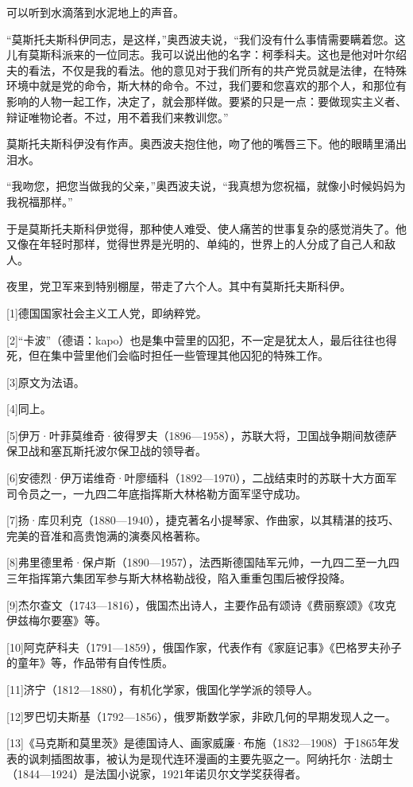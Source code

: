 可以听到水滴落到水泥地上的声音。

“莫斯托夫斯科伊同志，是这样，”奥西波夫说，“我们没有什么事情需要瞒着您。这儿有莫斯科派来的一位同志。我可以说出他的名字：柯季科夫。这也是他对叶尔绍夫的看法，不仅是我的看法。他的意见对于我们所有的共产党员就是法律，在特殊环境中就是党的命令，斯大林的命令。不过，我们要和您喜欢的那个人，和那位有影响的人物一起工作，决定了，就会那样做。要紧的只是一点：要做现实主义者、辩证唯物论者。不过，用不着我们来教训您。”

莫斯托夫斯科伊没有作声。奥西波夫抱住他，吻了他的嘴唇三下。他的眼睛里涌出泪水。

“我吻您，把您当做我的父亲，”奥西波夫说，“我真想为您祝福，就像小时候妈妈为我祝福那样。”

于是莫斯托夫斯科伊觉得，那种使人难受、使人痛苦的世事复杂的感觉消失了。他又像在年轻时那样，觉得世界是光明的、单纯的，世界上的人分成了自己人和敌人。

夜里，党卫军来到特别棚屋，带走了六个人。其中有莫斯托夫斯科伊。

[1]德国国家社会主义工人党，即纳粹党。

[2]“卡波”（德语：kapo）也是集中营里的囚犯，不一定是犹太人，最后往往也得死，但在集中营里他们会临时担任一些管理其他囚犯的特殊工作。

[3]原文为法语。

[4]同上。

[5]伊万·叶菲莫维奇·彼得罗夫（1896—1958），苏联大将，卫国战争期间敖德萨保卫战和塞瓦斯托波尔保卫战的领导者。

[6]安德烈·伊万诺维奇·叶廖缅科（1892—1970），二战结束时的苏联十大方面军司令员之一，一九四二年底指挥斯大林格勒方面军坚守成功。

[7]扬·库贝利克（1880—1940），捷克著名小提琴家、作曲家，以其精湛的技巧、完美的音准和高贵饱满的演奏风格著称。

[8]弗里德里希·保卢斯（1890—1957），法西斯德国陆军元帅，一九四二至一九四三年指挥第六集团军参与斯大林格勒战役，陷入重重包围后被俘投降。

[9]杰尔查文（1743—1816），俄国杰出诗人，主要作品有颂诗《费丽察颂》《攻克伊兹梅尔要塞》等。

[10]阿克萨科夫（1791—1859），俄国作家，代表作有《家庭记事》《巴格罗夫孙子的童年》等，作品带有自传性质。

[11]济宁（1812—1880），有机化学家，俄国化学学派的领导人。

[12]罗巴切夫斯基（1792—1856），俄罗斯数学家，非欧几何的早期发现人之一。

[13]《马克斯和莫里茨》是德国诗人、画家威廉·布施（1832—1908）于1865年发表的讽刺插图故事，被认为是现代连环漫画的主要先驱之一。阿纳托尔·法朗士（1844—1924）是法国小说家，1921年诺贝尔文学奖获得者。

